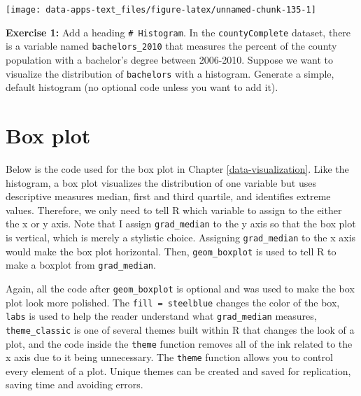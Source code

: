 \documentclass[
]{book}
\newenvironment{rmdblock}[1]
  {\begin{shaded*}
  }
  {\end{shaded*}
  }
\newenvironment{learncheck}
  {\begin{rmdblock}{warning}}
  {\end{rmdblock}}
\begin{document}
\begin{center}\texttt{[image: data-apps-text\_files/figure-latex/unnamed-chunk-135-1]} \end{center}

\begin{learncheck}
\textbf{Exercise 1:} Add a heading \texttt{\#\ Histogram}. In the
\texttt{countyComplete} dataset, there is a variable named
\texttt{bachelors\_2010} that measures the percent of the county
population with a bachelor's degree between 2006-2010. Suppose we want
to visualize the distribution of \texttt{bachelors} with a histogram.
Generate a simple, default histogram (no optional code unless you want
to add it).
\end{learncheck}

\hypertarget{box-plot}{%
\section{Box plot}\label{box-plot}}

Below is the code used for the box plot in Chapter \ref{data-visualization}. Like the histogram, a box plot visualizes the distribution of one variable but uses descriptive measures median, first and third quartile, and identifies extreme values. Therefore, we only need to tell R which variable to assign to the either the x or y axis. Note that I assign \texttt{grad\_median} to the y axis so that the box plot is vertical, which is merely a stylistic choice. Assigning \texttt{grad\_median} to the x axis would make the box plot horizontal. Then, \texttt{geom\_boxplot} is used to tell R to make a boxplot from \texttt{grad\_median}.

Again, all the code after \texttt{geom\_boxplot} is optional and was used to make the box plot look more polished. The \texttt{fill\ =\ \textquotesingle{}steelblue\textquotesingle{}} changes the color of the box, \texttt{labs} is used to help the reader understand what \texttt{grad\_median} measures, \texttt{theme\_classic} is one of several themes built within R that changes the look of a plot, and the code inside the \texttt{theme} function removes all of the ink related to the x axis due to it being unnecessary. The \texttt{theme} function allows you to control every element of a plot. Unique themes can be created and saved for replication, saving time and avoiding errors.
\end{document}
